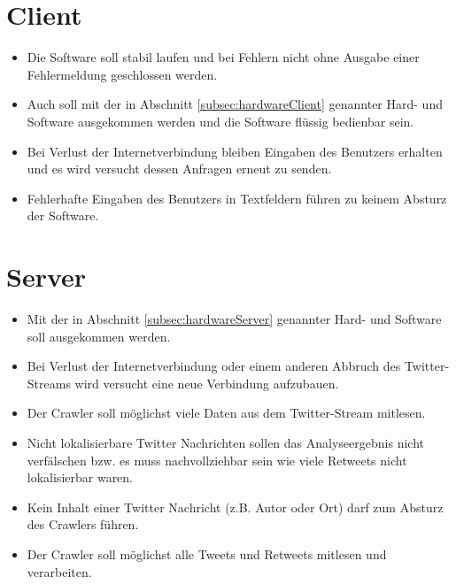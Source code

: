 
\section{Client}
\begin{itemize}
	\item Die Software soll stabil laufen und bei Fehlern nicht ohne Ausgabe einer Fehlermeldung geschlossen werden.
	\item Auch soll mit der in Abschnitt \ref{subsec:hardwareClient} genannter Hard- und Software ausgekommen werden und die Software flüssig bedienbar sein.
	\item Bei Verlust der Internetverbindung bleiben Eingaben des Benutzers erhalten und es wird versucht dessen Anfragen erneut zu senden.
	\item Fehlerhafte Eingaben des Benutzers in Textfeldern führen zu keinem Absturz der Software.
\end{itemize}
\section{Server}
\begin{itemize}
	\item Mit der in Abschnitt \ref{subsec:hardwareServer} genannter Hard- und Software soll ausgekommen werden.
	\item Bei Verlust der Internetverbindung oder einem anderen Abbruch des Twitter-Streams wird versucht eine neue Verbindung aufzubauen.
	\item Der Crawler soll möglichst viele Daten aus dem Twitter-Stream mitlesen.
	\item Nicht lokalisierbare Twitter Nachrichten sollen das Analyseergebnis nicht verfälschen bzw. es muss nachvollziehbar sein wie viele Retweets nicht lokalisierbar waren.
	\item Kein Inhalt einer Twitter Nachricht (z.B. Autor oder Ort) darf zum Absturz des Crawlers führen.
	\item Der Crawler soll möglichst alle Tweets und Retweets mitlesen und verarbeiten.
\end{itemize}
